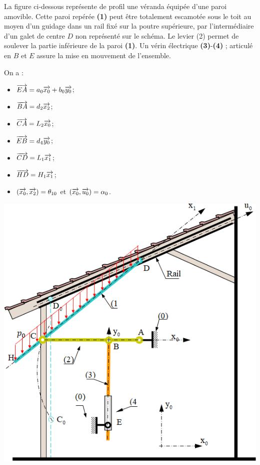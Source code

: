 \documentclass[10pt,fleqn]{article} %
\begin{document}
\begin{multicols}{2}
La figure ci-dessous représente de profil une véranda équipée d'une paroi amovible. Cette paroi repérée \textbf{(1)} peut être totalement escamotée sous le toit au moyen d'un guidage dans un rail fixé sur la poutre supérieure, par l'intermédiaire d'un galet de centre $D$ non représenté sur le schéma. Le levier (2) permet de soulever la partie inférieure de la paroi \textbf{(1)}. Un vérin électrique \textbf{(3)}-\textbf{(4)} ; articulé en $B$ et $E$ assure la mise en mouvement de l'ensemble.

On a : 
\begin{multicols}{2}
\begin{itemize}
\item $\overrightarrow{EA}=a_0\overrightarrow{x_0} + b_0\overrightarrow{y_0}$;
\item $\overrightarrow{BA}=d_2\overrightarrow{x_2}$;
\item $\overrightarrow{CA}=L_2\overrightarrow{x_0}$;
\item $\overrightarrow{EB}=d_4\overrightarrow{y_0}$;
\item $\overrightarrow{CD}=L_1\overrightarrow{x_1}$;
\item $\overrightarrow{HD}=H_1\overrightarrow{x_1}$;
\item $\left(\overrightarrow{x_0},\overrightarrow{x_2}\right)=\theta_{10}$ et $\left(\overrightarrow{x_0},\overrightarrow{u_0}\right)=\alpha_{0}$.
\end{itemize}
\end{multicols}

\begin{center}
\includegraphics[width=.9\linewidth]{images/fig_04}
\end{center}


\end{multicols}
\end{document}
